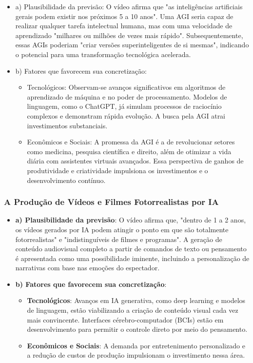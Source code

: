 \documentclass[a4paper,12pt]{article}
\begin{document}
\begin{itemize}
\item a) Plausibilidade da previsão: O vídeo afirma que "as inteligências artificiais gerais podem existir nos próximos 5 a 10 anos". Uma AGI seria capaz de realizar qualquer tarefa intelectual humana, mas com uma velocidade de aprendizado "milhares ou milhões de vezes mais rápido". Subsequentemente, essas AGIs poderiam "criar versões superinteligentes de si mesmas", indicando o potencial para uma transformação tecnológica acelerada.

\item b) Fatores que favorecem sua concretização:
  \begin{itemize}
  \item Tecnológicos: Observam-se avanços significativos em algoritmos de aprendizado de máquina e no poder de processamento. Modelos de linguagem, como o ChatGPT, já simulam processos de raciocínio complexos e demonstram rápida evolução. A busca pela AGI atrai investimentos substanciais.
  \item Econômicos e Sociais: A promessa da AGI é a de revolucionar setores como medicina, pesquisa científica e direito, além de otimizar a vida diária com assistentes virtuais avançados. Essa perspectiva de ganhos de produtividade e criatividade impulsiona os investimentos e o desenvolvimento contínuo.
  \end{itemize}
\end{itemize}

\subsubsection{A Produção de Vídeos e Filmes Fotorrealistas por IA}

\begin{itemize}
\item \textbf{a) Plausibilidade da previsão}: O vídeo afirma que, "dentro de 1 a 2 anos, os vídeos gerados por IA podem atingir o ponto em que são totalmente fotorrealistas" e "indistinguíveis de filmes e programas". A geração de conteúdo audiovisual completo a partir de comandos de texto ou pensamento é apresentada como uma possibilidade iminente, incluindo a personalização de narrativas com base nas emoções do espectador.

\item \textbf{b) Fatores que favorecem sua concretização}:
  \begin{itemize}
  \item \textbf{Tecnológicos}: Avanços em IA generativa, como deep learning e modelos de linguagem, estão viabilizando a criação de conteúdo visual cada vez mais convincente. Interfaces cérebro-computador (BCIs) estão em desenvolvimento para permitir o controle direto por meio do pensamento.
  \item \textbf{Econômicos e Sociais}: A demanda por entretenimento personalizado e a redução de custos de produção impulsionam o investimento nessa área.
  \end{itemize}
\end{itemize}
\end{document}

